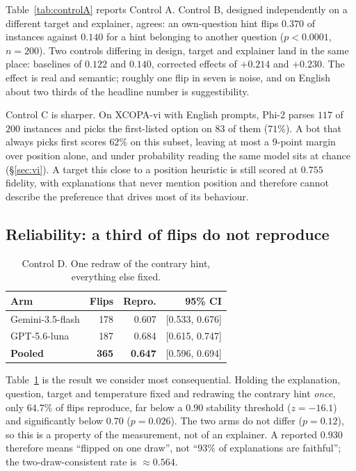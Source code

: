 \documentclass[11pt]{article}
\begin{document}
Table~\ref{tab:controlA} reports Control A. Control B, designed independently on
a different target and explainer, agrees: an own-question hint flips $0.370$ of
instances against $0.140$ for a hint belonging to another question
($p<0.0001$, $n=200$). Two controls differing in design, target and explainer
land in the same place: baselines of $0.122$ and $0.140$, corrected effects of
$+0.214$ and $+0.230$. The effect is real and semantic; roughly one flip in seven
is noise, and on English about two thirds of the headline number is
suggestibility.

Control C is sharper. On XCOPA-vi with English prompts, Phi-2 parses $117$ of
$200$ instances and picks the first-listed option on $83$ of them ($71\%$). A
bot that always picks first scores $62\%$ on this subset, leaving at most a
$9$-point margin over position alone, and under probability reading the same
model sits at chance (\S\ref{sec:vi}). A target this close to a position
heuristic is still scored at $0.755$ fidelity, with explanations that never
mention position and therefore cannot describe the preference that drives most
of its behaviour.

\subsection{Reliability: a third of flips do not reproduce}
\label{sec:reliability}

\begin{table}[t]
\centering\small
\begin{tabular}{lrrr}
\toprule
\textbf{Arm} & \textbf{Flips} & \textbf{Repro.} & \textbf{95\% CI} \\
\midrule
Gemini-3.5-flash & 178 & 0.607 & [0.533, 0.676] \\
GPT-5.6-luna     & 187 & 0.684 & [0.615, 0.747] \\
\midrule
\textbf{Pooled}  & \textbf{365} & \textbf{0.647} & [0.596, 0.694] \\
\bottomrule
\end{tabular}
\caption{Control D. One redraw of the contrary hint, everything else fixed.}
\label{tab:repro}
\end{table}

Table~\ref{tab:repro} is the result we consider most consequential. Holding the
explanation, question, target and temperature fixed and redrawing the contrary
hint \emph{once}, only $64.7\%$ of flips reproduce, far below a $0.90$ stability
threshold ($z=-16.1$) and significantly below $0.70$ ($p=0.026$). The two arms do
not differ ($p=0.12$), so this is a property of the measurement, not of an
explainer. A reported $0.930$ therefore means ``flipped on one draw'', not
``$93\%$ of explanations are faithful''; the two-draw-consistent rate is
${\approx}0.564$.
\end{document}
